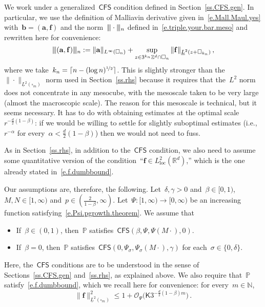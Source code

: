 \documentclass[11pt,twoside]{article} %
\let\oldsquare\square %
\renewcommand{\square}{\oldsquare}
\numberwithin{equation}{section}
\theoremstyle{definition}
\newcommand{\vertiii}{\vert\kern-0.3ex\vert\kern-0.25ex\vert}
\newcommand*{\N}{\ensuremath{\mathbb{N}}}
\newcommand*{\Zd}{\ensuremath{\mathbb{Z}^d}}
\newcommand*{\Rd}{\ensuremath{\mathbb{R}^d}}
\renewcommand{\b}{\ensuremath{\mathbf{b}}}
\newcommand{\f}{\mathbf{f}}
\renewcommand{\a}{\mathbf{a}}
\newcommand{\cu}{\square}
\renewcommand{\P}{\mathbb{P}}
\renewcommand{\O}{\mathcal{O}}
\newcommand{\CFS}{\mathsf{CFS}}
\begin{document}
We work under a generalized~$\CFS$ condition defined in Section~\ref{ss.CFS.gen}. In particular, we use the definition of Malliavin derivative given in~\eqref{e.Mall.Maul.yes} with~$\b = (\a,\f)$ and the norm~$\vertiii\cdot \vertiii_n$ defined in~\eqref{e.triple.your.bar.meso} and rewritten here for convenience: 
\begin{equation}
\label{e.triple.your.bar.meso.again}
\vertiii (\a,\f) \vertiii_n:= \| \a \|_{L^\infty(\cu_n)} 
+
\sup_{z\in 3^{k_n} \Zd \cap \cu_n}
\| \f \|_{\underline{L}^2(z+\cu_{k_n})}
\,,
\end{equation}
where we take~$k_n =  \lceil n - (\log n)^{\nicefrac12} \rceil$.
This is slightly stronger than the~$\| \cdot \|_{\underline{L}^2(\cu_m)}$ norm used in Section~\ref{ss.rhs} because it requires that the~$L^2$ norm does not concentrate in any mesocube, with the mesoscale taken to be very large (almost the macroscopic scale). 
The reason for this mesoscale is technical, but it seems necessary. It has to do with obtaining estimates at the optimal scale~$r^{-\frac d2(1-\beta)}$: if we would be willing to settle for slightly suboptimal estimates (i.e.,~$r^{-\alpha}$ for every~$\alpha<\frac d2(1-\beta)$) then we would not need to fuss. 

\smallskip

As in Section~\ref{ss.rhs}, in addition to the~$\CFS$ condition, we also need to assume some quantitative version of the condition~``$\f \in L^2_{\mathrm{loc}}(\Rd)$,'' which is the one already stated in~\eqref{e.f.dumbbound}.

\smallskip

Our assumptions are, therefore, the following. 
Let~$\delta,\gamma> 0$ and~$\beta \in [0,1)$,~$M, N \in [1,\infty)$ and~$p \in (\frac{2}{1-\beta},\infty)$.  
Let~$\Psi:[1,\infty) \to [0,\infty)$ be an increasing function satisfying~\eqref{e.Psi.pgrowth.theorem}.
We assume that 
\begin{itemize}
\item If~$\beta \in (0,1)$, then~$\P$ satisfies~$\CFS(\beta,\Psi,\Psi(M\cdot),0)$.
\item If~$\beta = 0$, then~$\P$ satisfies~$\CFS(0,\Psi_\sigma,\Psi_\sigma(M\cdot),\gamma)$ for each~$\sigma \in \{0,\delta\}$.
\end{itemize}
Here, the~$\CFS$ conditions are to be understood in the sense of Sections~\ref{ss.CFS.gen} and~\ref{ss.rhs}, as explained above. 
We also require that~$\P$ satisfy~\eqref{e.f.dumbbound}, which we recall here for convenience: for every~$m\in\N$, 
\begin{equation}
\label{e.f.dumbbound.again}
\| \f \|_{\underline{L}^2(\cu_m)}^2 
\leq 
1 +  \O_\Psi\bigl(\mathsf{K}  3^{-\frac d2 (1-\beta) m} \bigr)
\,.
\end{equation}
\end{document}

